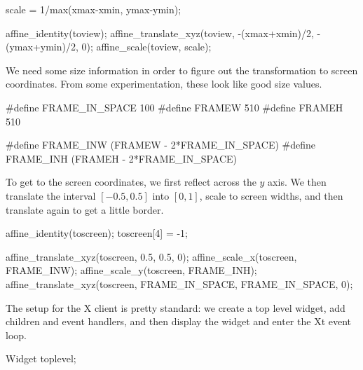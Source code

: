 \nwenddocs{}\endmoddef
scale = 1/max(xmax-xmin, ymax-ymin);

affine_identity(toview);
affine_translate_xyz(toview, -(xmax+xmin)/2, -(ymax+ymin)/2, 0);
affine_scale(toview, scale);
\nwendcode{}\nwdocspar

We need some size information in order to figure out the
transformation to screen coordinates.  From some experimentation,
these look like good size values.

\nwenddocs{}\plusendmoddef
#define FRAME_IN_SPACE 100
#define FRAMEW 510
#define FRAMEH 510

#define FRAME_INW (FRAMEW - 2*FRAME_IN_SPACE)
#define FRAME_INH (FRAMEH - 2*FRAME_IN_SPACE)

\nwendcode{}\nwdocspar

To get to the screen coordinates, we first reflect across
the $y$ axis.  We then translate the
interval $[-0.5, 0.5]$ into $[0,1]$, scale to screen widths,
and then translate again to get a little border.

\nwenddocs{}\endmoddef
affine_identity(toscreen);
toscreen[4] = -1;

affine_translate_xyz(toscreen, 0.5, 0.5, 0);
affine_scale_x(toscreen, FRAME_INW);
affine_scale_y(toscreen, FRAME_INH);
affine_translate_xyz(toscreen, FRAME_IN_SPACE, FRAME_IN_SPACE, 0);

\nwendcode{}\nwdocspar

The setup for the X client is pretty standard: we create a top level
widget, add children and event handlers, and then display the widget
and enter the Xt event loop.

\nwenddocs{}\endmoddef
Widget toplevel;
\nwendcode{}\nwdocspar

